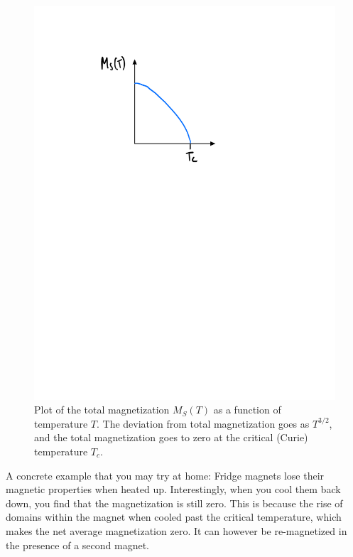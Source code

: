 \begin{figure}[htbp]
    \centering
    \includegraphics[scale=0.7]{Images/fig-magnetizationvstemperature.pdf}
    
    \caption{Plot of the total magnetization $M_S(T)$ as a function of temperature $T$. The deviation from total magnetization goes as $T^{3/2}$, and the total magnetization goes to zero at the critical (Curie) temperature $T_c$.}
    \label{fig-magnetizationvstemperature}
\end{figure}

A concrete example that you may try at home: Fridge magnets lose their magnetic properties when heated up. Interestingly, when you cool them back down, you find that the magnetization is still zero. This is because the rise of domains within the magnet when cooled past the critical temperature, which makes the net average magnetization zero. It can however be re-magnetized in the presence of a second magnet.

